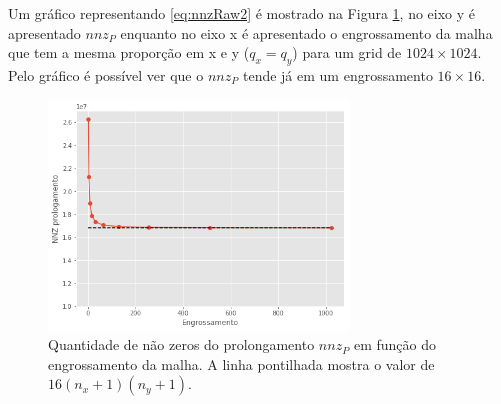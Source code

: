 Um gráfico representando    \eqref{eq:nnzRaw2} é mostrado na Figura \ref{fig:nnzGrafico}, no eixo y é apresentado $nnz_P$ enquanto no eixo x é apresentado o engrossamento da malha que tem a mesma proporção em x e y ($q_x  = q_y$) para um grid de $1024 \times 1024$. Pelo gráfico é possível ver que o $nnz_P$ tende já em um engrossamento $16 \times 16$.


\begin{figure}[!htbp]
\centering
\includegraphics[width=8cm]{chap06/figs/nnzProlongamento.png}
\caption{Quantidade de não zeros do prolongamento $nnz_P$  em função do engrossamento da malha. A linha pontilhada mostra o valor de $16(n_x+1)(n_y+1)$.}
\label{fig:nnzGrafico}
\end{figure}
